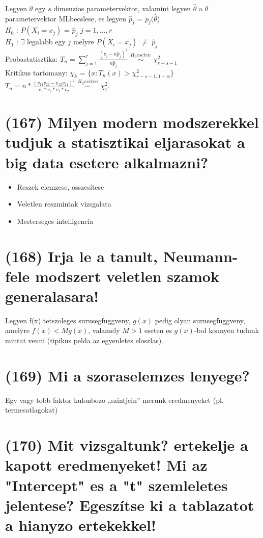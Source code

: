 \documentclass[12p]{article}
\begin{document}
Legyen $\theta$ egy $s$ dimenzios parametervektor, valamint legyen $\hat{\theta}$ a $\theta$ parametervektor MLbecslese, es legyen $\hat{p}_j$ = $p_j (\hat{\theta}$)\\
$H_0$ : $P(X_i = x_j)$ = $\hat{p}_j$ $j = 1,. . . , r$\\
$H_1$ : $\exists$ legalabb egy $j$ melyre $P(X_i = x_j)$ $\neq$ $\hat{p}_j$\\
Probastatisztika: $T_n = \displaystyle{\sum_{j=1}^{r}}\frac{(v_j - n\hat{p}_j)^2}{n\hat{p}_j}$ $\stackrel{H_0 eseten}{\sim}$ $\chi^2_{r-s-1}$\\
Kritikus tartomany: $\chi_k$ = $\{x: T_n(x) > \chi^2_{r-s-1,1-\alpha}\}$\\
$T_n = n * \frac{(v_{11}v_{22} - v_{12}v_{21})^2}{v_1 * v_2 * v_1 * v_2}$ $\stackrel{H_0 eseten}{\sim}$ $\chi^2_1$.



\section{(167) Milyen modern modszerekkel tudjuk a statisztikai eljarasokat a big data esetere alkalmazni?}

\begin{itemize}
\item Reszek elemzese, osszesítese
\item Veletlen reszmintak vizsgalata
\item Mesterseges intelligencia
\end{itemize}


\section{(168) Irja le a tanult, Neumann-fele modszert veletlen szamok generalasara!}
Legyen f(x) tetszoleges surusegfuggveny, $g(x)$ pedig olyan surusegfuggveny, amelyre $f(x) < Mg(x)$, valamely $M>1$ eseten es $g(x)$-bol konnyen tudunk mintat venni (tipikus pelda az egyenletes eloszlas).

\section{(169) Mi a szoraselemzes lenyege?}
Egy vagy tobb faktor kulonbozo „szintjein” merunk eredmenyeket (pl. termesatlagokat)


\section{(170) Mit vizsgaltunk? ertekelje a kapott eredmenyeket! Mi az "Intercept" es a "t" szemleletes
jelentese? Egeszítse ki a tablazatot a hianyzo ertekekkel!}
\end{document}
